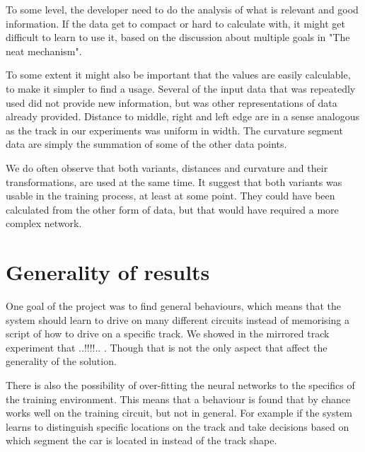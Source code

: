 To some level, the developer need to do the analysis of what is relevant and good information. If the data get to compact or hard to calculate with, it might get difficult to learn to use it, based on the discussion about multiple goals in "The neat mechanism".

To some extent it might also be important that the values are easily calculable, to make it simpler to find a usage. Several of the input data that was repeatedly used did not provide new information, but was other representations of data already provided. Distance to middle, right and left edge are in a sense analogous as the track in our experiments was uniform in width. The curvature segment data are simply the summation of some of the other data points.

We do often observe that both variants, distances and curvature and their transformations, are used at the same time. It suggest that both variants was usable in the training process, at least at some point. They could have been calculated from the other form of data, but that would have required a more complex network.




\section{Generality of results}

One goal of the project was to find general behaviours, which means that the system should learn to drive on many different circuits instead of memorising a script of how to drive on a specific track. We showed in the mirrored track experiment that ..!!!!.. . Though that is not the only aspect that affect the generality of the solution. 

There is also the possibility of over-fitting the neural networks to the specifics of the training environment. This means that a behaviour is found that by chance works well on the training circuit, but not in general. For example if the system learns to distinguish specific locations on the track and take decisions based on which segment the car is located in instead of the track shape.





